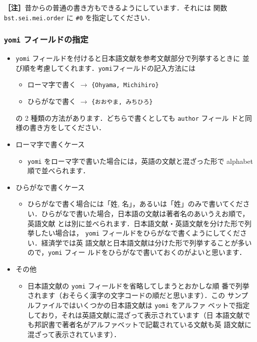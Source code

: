 \documentclass[a4j,10pt]{jarticle}
\begin{document}
\noindent \textbf{［注］}昔からの普通の書き方もできるようにしています．それには
関数\texttt{bst.sei.mei.order} に \verb|#0| を指定してください．


\subsubsection{\texttt{yomi} フィールドの指定}

\begin{itemize}
 \item \texttt{yomi} フィールドを付けると日本語文献を参考文献部分で列挙するときに
      並び順を考慮してくれます．\texttt{yomi}フィールドの記入方法には
       \begin{itemize}
        \item ローマ字で書く $\longrightarrow$ \verb|{Ohyama, Michihiro}|
        \item ひらがなで書く $\longrightarrow$ \verb|{おおやま, みちひろ}|
       \end{itemize}
       の 2 種類の方法があります．どちらで書くとしても \texttt{author} フィール
       ドと同様の書き方をしてください．
 \item ローマ字で書くケース
       \begin{itemize}
        \item \texttt{yomi} をローマ字で書いた場合には，英語の文献と混ざった形で
       alphabet 順で並べられます．
       \end{itemize}
 \item ひらがなで書くケース
       \begin{itemize}
        \item   ひらがなで書く場合には「姓, 名」，あるいは「姓」のみで書いてくださ
       い．ひらがなで書いた場合，日本語の文献は著者名のあいうえお順で，英語文献
       とは別に並べられます．日本語文献・英語文献を分けた形で列挙したい場合は，
       \texttt{yomi} フィールドをひらがなで書くようにしてください．経済学では英
       語文献と日本語文献は分けた形で列挙することが多いので，\texttt{yomi} フィー
       ルドをひらがなで書いておくのがよいと思います．
       \end{itemize}
 \item その他
       \begin{itemize}
        \item 日本語文献の \texttt{yomi} フィールドを省略してしまうとおかしな順
              番で列挙されます（おそらく漢字の文字コードの順だと思います）．この
              サンプルファイルではいくつかの日本語文献は \texttt{yomi} をアルファ
              ベットで指定しており，それは英語文献に混ざって表示されています（日
              本語文献でも邦訳書で著者名がアルファベットで記載されている文献も英
              語文献に混ざって表示されています）．
       \end{itemize}
\end{itemize}
\end{document}
